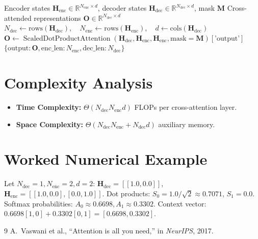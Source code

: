 \documentclass[11pt,a4paper]{article}
\theoremstyle{definition}
\begin{document}
\begin{algorithm}[H]
\caption{Encoder-Decoder Cross-Attention Forward Pass}
\label{alg:enc_dec_attn}
\begin{algorithmic}[1]
\Require Encoder states $\mathbf{H}_{\text{enc}} \in \mathbb{R}^{N_{\text{enc}} \times d}$, decoder states $\mathbf{H}_{\text{dec}} \in \mathbb{R}^{N_{\text{dec}} \times d}$, mask $\mathbf{M}$
\Ensure Cross-attended representations $\mathbf{O} \in \mathbb{R}^{N_{\text{dec}} \times d}$
\State $N_{\text{dec}} \gets \text{rows}(\mathbf{H}_{\text{dec}}), \quad N_{\text{enc}} \gets \text{rows}(\mathbf{H}_{\text{enc}}), \quad d \gets \text{cols}(\mathbf{H}_{\text{dec}})$
\State $\mathbf{O} \gets \operatorname{ScaledDotProductAttention}(\mathbf{H}_{\text{dec}}, \mathbf{H}_{\text{enc}}, \mathbf{H}_{\text{enc}}, \text{mask}=\mathbf{M})[\text{'output'}]$
\State \Return $\{\text{output}: \mathbf{O}, \text{enc\_len}: N_{\text{enc}}, \text{dec\_len}: N_{\text{dec}}\}$
\end{algorithmic}
\end{algorithm}

\section{Complexity Analysis}
\begin{itemize}
    \item \textbf{Time Complexity:} $\Theta(N_{\text{dec}} N_{\text{enc}} d)$ FLOPs per cross-attention layer.
    \item \textbf{Space Complexity:} $\Theta(N_{\text{dec}} N_{\text{enc}} + N_{\text{dec}} d)$ auxiliary memory.
\end{itemize}

\section{Worked Numerical Example}
Let $N_{\text{dec}} = 1, N_{\text{enc}} = 2, d = 2$:
$\mathbf{H}_{\text{dec}} = [[1.0, 0.0]]$, $\mathbf{H}_{\text{enc}} = [[1.0, 0.0], [0.0, 1.0]]$.
Dot products: $S_0 = 1.0 / \sqrt{2} \approx 0.7071$, $S_1 = 0.0$.
Softmax probabilities: $A_0 \approx 0.6698, A_1 \approx 0.3302$.
Context vector: $0.6698 [1, 0] + 0.3302 [0, 1] = [0.6698, 0.3302]$.

\begin{thebibliography}{9}
 A.~Vaswani et al., ``Attention is all you need,'' in \emph{NeurIPS}, 2017.
\end{thebibliography}
\end{document}
